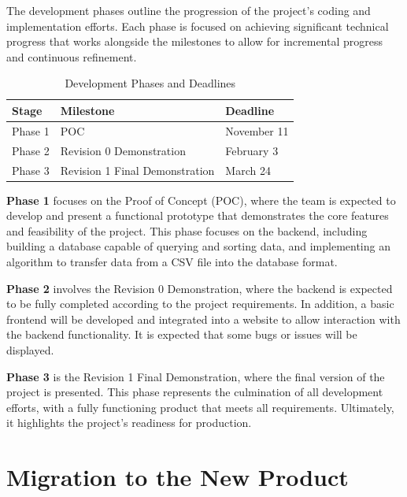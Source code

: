 \documentclass[12pt]{article}
\begin{document}
The development phases outline the progression of the project's coding and
implementation efforts. Each phase is focused on achieving significant technical
progress that works alongside the milestones to allow for incremental progress
and continuous refinement.

\begin{table}[htbp]
  \centering
  \begin{tabular}{|l|l|l|}
\hline
\textbf{Stage} & \textbf{Milestone} & \textbf{Deadline} \\
\hline
Phase 1 & POC & November 11 \\
\hline
Phase 2 & Revision 0 Demonstration & February 3 \\
\hline
Phase 3 & Revision 1 Final Demonstration & March 24 \\
\hline
\end{tabular}
\caption{Development Phases and Deadlines}
\end{table}

\textbf{Phase 1} focuses on the Proof of Concept (POC), where the team is
expected to develop and present a functional prototype that demonstrates the
core features and feasibility of the project. This phase focuses on the backend,
including building a database capable of querying and sorting data, and
implementing an algorithm to transfer data from a CSV file into the database
format.

\textbf{Phase 2} involves the Revision 0 Demonstration, where the backend is
expected to be fully completed according to the project requirements. In
addition, a basic frontend will be developed and integrated into a website to
allow interaction with the backend functionality. It is expected that some bugs
or issues will be displayed.

\textbf{Phase 3} is the Revision 1 Final Demonstration, where the final version
of the project is presented. This phase represents the culmination of all
development efforts, with a fully functioning product that meets all
requirements. Ultimately, it highlights the project's readiness for production.


\section{Migration to the New Product}
\end{document}
